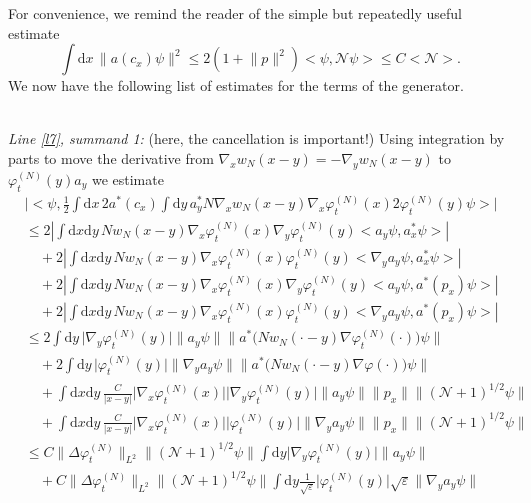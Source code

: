 \documentclass[11pt,a4paper,draft,DIV11]{scrartcl}	%
\newcommand{\di}{\textrm{d}}		%
\newcommand{\Ncal}{\mathcal{N}}		%
\newcommand{\estlist}[2]{\emph{\vspace{.3em}\\Line \ref{l#1}, summand #2:}}
\newcommand{\scal}[2]{\big<#1,#2\big>} %
\newcommand{\norm}[1]{\lVert#1\rVert}	%
\newcommand{\ev}[1]{\big<#1\big>}	%
\newcommand{\ph}{\varphi_t^{(N)}}	%
\newcommand{\bd}{\begin{displaymath}}			%
\newcommand{\ed}{\end{displaymath}}
\begin{document}
For convenience, we remind the reader of the simple but repeatedly useful estimate
\bd
\int \di x\, \norm{a(c_x)\psi}^2 \leq 2(1+\norm{p}^2)\scal{\psi}{\Ncal\psi} \leq C\ev{\Ncal}.
\ed
We now have the following list of estimates for the terms of the generator.\newline
\begin{fleqn}[0.5em]	%
\estlist{7}{1} (here, the cancellation is important!)
Using integration by parts to move the derivative from $\nabla_x w_N(x-y) = - \nabla_y w_N(x-y)$ to $\ph(y) a_y$ we estimate
\begin{align*}
& \lvert \scal{\psi}{\frac{1}{2}\int \di x\, 2a^\ast(c_x) \int \di y\,a^\ast_y N\nabla_x w_N(x-y)\nabla_x \ph(x) 2\ph(y) \psi}\rvert \\
& \leq 2\left\lvert \int \di x \di y\, Nw_N(x-y) \nabla_x \ph(x)  \nabla_y \ph(y) \scal{a_y\psi}{a^\ast_x\psi} \right\rvert \\
& \quad + 2\left\lvert \int \di x \di y\,  Nw_N(x-y) \nabla_x \ph(x) \ph(y)  \scal{\nabla_y a_y\psi}{a^\ast_x \psi} \right\rvert \\
& \quad + 2\left\lvert \int \di x \di y\, Nw_N(x-y) \nabla_x  \ph(x) \nabla_y \ph(y) \scal{a_y \psi}{a^\ast(p_x)\psi} \right\rvert \\
& \quad + 2\left\lvert \int \di x \di y\, Nw_N(x-y) \nabla_x \ph(x) \ph(y) \scal{\nabla_y a_y\psi}{a^\ast(p_x)\psi} \right\rvert \\
&\leq 2\int \di y\,\lvert \nabla_y \ph(y)\rvert \norm{a_y \psi} \norm{a^\ast\big(Nw_N(\cdot -y)\nabla\ph(\cdot)\big)\psi} \\
& \quad + 2\int \di y\,\lvert \ph(y)\rvert \norm{\nabla_y a_y\psi} \norm{a^\ast\big(Nw_N(\cdot-y)\nabla\varphi(\cdot)\big)\psi} \\
& \quad + \int \di x\di y\, \frac{C}{\lvert x-y\rvert} \lvert \nabla_x\ph(x)\rvert \lvert \nabla_y \ph(y)\rvert \norm{a_y \psi} \norm{p_x} \norm{(\Ncal+1)^{1/2}\psi} \\
& \quad + \int \di x\di y\, \frac{C}{\lvert x-y\rvert} \lvert \nabla_x\ph(x)\rvert \lvert \ph(y)\rvert \norm{\nabla_y a_y\psi} \norm{p_x} \norm{(\Ncal+1)^{1/2}\psi} \\
&\leq C \norm{\Delta\ph}_{L^2} \norm{(\Ncal+1)^{1/2}\psi} \int \di y \lvert \nabla_y \ph(y) \rvert \norm{a_y \psi} \\
& \quad + C \norm{\Delta \ph}_{L^2} \norm{(\Ncal+1)^{1/2}\psi} \int \di y \frac{1}{\sqrt{\varepsilon}} \lvert \ph(y)\rvert \sqrt{\varepsilon} \norm{\nabla_y a_y\psi} \\

\end{align*}
\end{fleqn}
\end{document}
